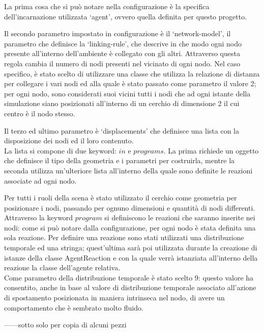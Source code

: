 La prima cosa che si può notare nella configurazione è la specifica dell'incarnazione utilizzata `agent', ovvero quella definita per questo progetto.
\newline

Il secondo parametro impostato in configurazione è il `network-model', il parametro che definisce la `linking-rule', che descrive in che modo ogni nodo presente all'interno dell'ambiente è collegato con gli altri. Attraverso questa regola cambia il numero di nodi presenti nel vicinato di ogni nodo. Nel caso specifico, è stato scelto di utilizzare una classe che utilizza la relazione di distanza per collegare i vari nodi ed alla quale è stato passato come parametro il valore 2; per ogni nodo, sono considerati suoi vicini tutti i nodi che ad ogni istante della simulazione siano posizionati all'interno di un cerchio di dimensione 2 il cui centro è il nodo stesso.
\newline

Il terzo ed ultimo parametro è `displacements' che definisce una lista con la disposizione dei nodi ed il loro contenuto.
\\
La lista si compone di due keyword: $in$ e $programs$. La prima richiede un oggetto che definisce il tipo della geometria e i parametri per costruirla, mentre la seconda utilizza un'ulteriore lista all'interno della quale sono definite le reazioni associate ad ogni nodo.

Per tutti i ruoli della scena è stato utilizzato il cerchio come geometria per posizionare i nodi, passando per ognuno dimensioni e quantità di nodi differenti.
\\
Attraverso la keyword $program$ si definiscono le reazioni che saranno inserite nei nodi: come si può notare dalla configurazione, per ogni nodo è stata definita una sola reazione.
Per definire una reazione sono stati utilizzati una distribuzione temporale ed una stringa; quest'ultima sarà poi utilizzata durante la creazione di istanze della classe AgentReaction e con la quale verrà istanziata all'interno della reazione la classe dell'agente relativa.
\\
Come parametro della distribuzione temporale è stato scelto 9: questo valore ha consentito, anche in base al valore di distribuzione temporale associato all'azione di spostamento posizionata in maniera intrinseca nel nodo, di avere un comportamento che è sembrato molto fluido.






------sotto solo per copia di alcuni pezzi





